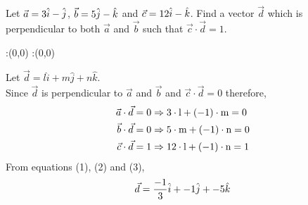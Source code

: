 


\question[2] Let $\vec{a}=3\hat{i}-\hat{j}$, $\vec{b}=5\hat{j}-\hat{k}$ 
and $\vec{c}=12\hat{i}-\hat{k}$. Find a vector $\vec{d}$ which is perpendicular
to both $\vec{a}$ and $\vec{b}$ such that $\vec{c}\cdot\vec{d}=1$.


\watchout

\ifprintanswers
  \begin{marginfigure}
      :(0,0)
      :(0,0)
    \figdrawbegin{}
      \figdrawline [100,101]
    \figdrawend
    \figvisu{\figBoxA}{}{%
    }
    \centerline{\box\figBoxA}
  \end{marginfigure}
\fi 

\begin{solution}[\halfpage]
Let $\vec{d}= l\hat{i}+m\hat{j}+n\hat{k}$. \\
Since $\vec{d}$ is perpendicular to $\vec{a}$ and $\vec{b}$ 
and $\vec{c}\cdot\vec{d}=0$ therefore,
\begin{align}
  \vec{a}\cdot\vec{d}&=0 \Rightarrow 3\cdot\text{l} + (-1)\cdot\text{m} = 0 \\
  \vec{b}\cdot\vec{d}&=0 \Rightarrow 5\cdot\text{m} + (-1)\cdot\text{n} = 0 \\
  \vec{c}\cdot\vec{d}&=1 \Rightarrow 12\cdot\text{l} + (-1)\cdot\text{n} = 1 
\end{align}
From equations (1), (2) and (3),
\begin{align}
  \vec{d}=\dfrac{-1}{3}\hat{i} + -1\hat{j} + -5\hat{k} 
\end{align}

\end{solution}

